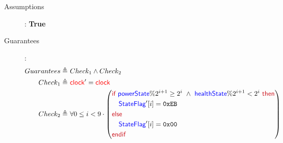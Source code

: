 \documentclass[fleqn,a4paper]{article}
\newcommand\Var[1]{\textcolor{blue}{\textsf{#1}}}
\newcommand\syntax[1]{\textcolor[RGB]{202,12,22}{\textsf{#1}}}
\newcommand\clock{\textcolor{red}{\textsf{clock}}}
\newcommand\definedby{\triangleq}
\begin{document}
\begin{description}
\item[Assumptions]: \textbf{True}

\item[Guarantees]:
\begin{align*}
Guarantees \definedby \
& Check_1 \wedge Check_2 \\
Check_1 \definedby \
& \clock'=\clock \\
Check_2 \definedby \
& \forall 0 \leq i < 9 \cdot
\left(
\begin{aligned}
& \syntax{if } \Var{powerState} \% 2^{i+1} \geq 2^i  \ \wedge \ \Var{healthState} \% 2^{i+1} < 2^i \syntax{ then} \\
& \quad \Var{StateFlag}'[i] = \texttt{0xEB} \\
& \syntax{else} \\
& \quad \Var{StateFlag}'[i] = \texttt{0x00} \\
& \syntax{endif}
\end{aligned}
\right)
\end{align*}

\end{description}
\end{document}
